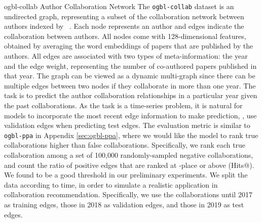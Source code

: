 \dataset
{ogbl-collab}
{Author Collaboration Network}
{The \texttt{ogbl-collab} dataset is an undirected graph, representing a subset of the collaboration network between authors indexed by ~\citep{wang2020mag}.
Each node represents an author and edges indicate the collaboration between authors. All nodes come with 128-dimensional features, obtained by averaging the word embeddings of papers that are published by the authors. All edges are associated with two types of meta-information: the year and the edge weight, representing the number of co-authored papers published in that year. 
The graph can be viewed as a dynamic multi-graph since there can be multiple edges between two nodes if they collaborate in more than one year. 
}
{The task is to predict the author collaboration relationships in a particular year given the past collaborations. 
As the task is a time-series problem, it is natural for models to incorporate the most recent edge information to make prediction, \eg, use validation edges when predicting test edges.
The evaluation metric is similar to \texttt{ogbl-ppa} in Appendix \ref{sec:ogbl-ppa}, where we would like the model to rank true collaborations higher than false collaborations. Specifically, we rank each true collaboration among a set of 100,000 randomly-sampled negative collaborations, and count the ratio of positive edges that are ranked at -place or above (Hits@). We found  to be a good threshold in our preliminary experiments.
}
{We split the data according to time, in order to simulate a realistic application in collaboration recommendation. Specifically, we use the collaborations until 2017 as training edges, those in 2018 as validation edges, and those in 2019 as test edges.}
